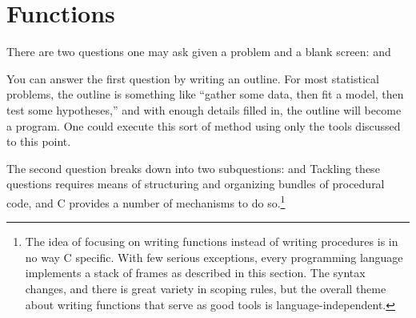 

\section{Functions} \label{functional}

There are two questions one may ask given a problem and a blank screen:
 and 

You can answer the first question by writing an outline. For most
statistical problems, the outline is something like ``gather some data,
then fit a model, then test some hypotheses,'' and with enough details
filled in, the outline will become a program. One could execute this
sort of method using only the tools discussed to this point.

The second question breaks down into two subquestions:  and 
Tackling these questions requires means of structuring and organizing
bundles of procedural code, and C provides a number of mechanisms to
do so.\footnote{The idea of focusing on writing functions instead of
writing procedures is in no way C specific. With few serious exceptions,
every programming language implements a stack of frames as described in
this section. The syntax changes, and there is great variety in 
scoping rules, but the overall theme about writing functions that
serve as good tools is language-independent.}

